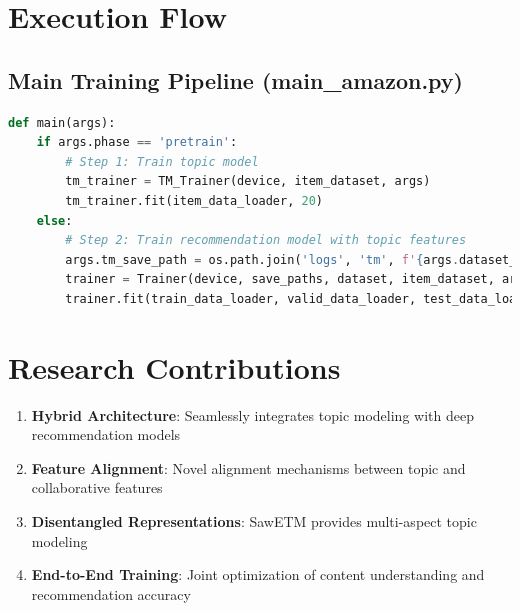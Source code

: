 \section{Execution Flow}

\subsection{Main Training Pipeline (main\_amazon.py)}

\begin{lstlisting}[language=Python, caption=Main Training Pipeline]
def main(args):
    if args.phase == 'pretrain':
        # Step 1: Train topic model
        tm_trainer = TM_Trainer(device, item_dataset, args)
        tm_trainer.fit(item_data_loader, 20)
    else:
        # Step 2: Train recommendation model with topic features
        args.tm_save_path = os.path.join('logs', 'tm', f'{args.dataset_name}_{args.tm_model_name}_{args.tm_input_type}_{args.tm_alpha}_{args.tm_gamma}_pretrain', 'model.pth')
        trainer = Trainer(device, save_paths, dataset, item_dataset, args)
        trainer.fit(train_data_loader, valid_data_loader, test_data_loader, args.epoch)
\end{lstlisting}

\section{Research Contributions}

\begin{enumerate}
    \item \textbf{Hybrid Architecture}: Seamlessly integrates topic modeling with deep recommendation models
    \item \textbf{Feature Alignment}: Novel alignment mechanisms between topic and collaborative features
    \item \textbf{Disentangled Representations}: SawETM provides multi-aspect topic modeling
    \item \textbf{End-to-End Training}: Joint optimization of content understanding and recommendation accuracy
\end{enumerate}